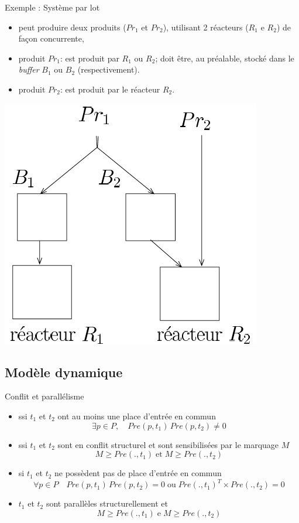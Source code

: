 \documentclass[compress]{beamer}
\begin{document}
\begin{frame}{Exemple : Système par lot}
\begin{itemize}
\item peut produire deux produits ($Pr_1$ et $Pr_2$), utilisant 2 réacteurs
($R_1$ e $R_2$) de fa\c{c}on concurrente,
\item produit $Pr_1$: est produit par $R_1$ ou $R_2$; doit être, au préalable,
stocké dans le {\it buffer} $B_1$ ou $B_2$ (respectivement).
\item produit $Pr_2$: est produit par le réacteur $R_2$.
\end{itemize}
\begin{center}
\includegraphics[width=.4\linewidth]{reacteur}
\end{center}
\end{frame}
 
\subsection{Modèle dynamique}
\begin{frame}{Conflit et parallélisme}
\begin{itemize}
\item {} ssi  $t_1$ et $t_2$ ont au moins une place d'entrée en commun
	$$\exists p \in P, \quad Pre(p,t_1) \, Pre(p,t_2) \neq 0$$
\item {} ssi $t_1$ et $t_2$ sont en conflit structurel et sont sensibilisées par le marquage $M$
	$$M \geq Pre(.,t_1) \; \mbox{et} \; M \geq  Pre(.,t_2)$$
\item {} si $t_1$ et $t_2$ ne possèdent pas de place d'entrée en commun
	$$\forall p \in P \quad Pre(p,t_1) \, Pre(p,t_2) = 0  \;
	\mbox{ou} \; Pre(.,t_1)^T \times Pre(.,t_2) = 0$$
\item {} $t_1$ et $t_2$ sont parallèles structurellement et
$$M \geq Pre(.,t_1) \; \mbox{e} \; M \geq Pre(.,t_2)$$
\end{itemize}
\end{frame}
\end{document}
